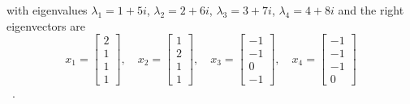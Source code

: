 \documentclass[12pt]{article}
\begin{document}
with eigenvalues $\lambda_1 = 1+5i$, $\lambda_2 = 2+6i$, $\lambda_3 = 3+7i$, $\lambda_4=4+8i$
and the right eigenvectors are
\[
x_1=\left[\begin{array}{l}
2 \\
1 \\
1 \\
1
\end{array}\right], \quad x_2=\left[\begin{array}{l}
1 \\
2 \\
1 \\
1
\end{array}\right], \quad x_3=\left[\begin{array}{c}
-1 \\
-1 \\
0 \\
-1
\end{array}\right], \quad x_4=\left[\begin{array}{c}
-1 \\
-1 \\
-1 \\
0
\end{array}\right]
\]~\cite{Gregory1969ACO}.
\end{document}
